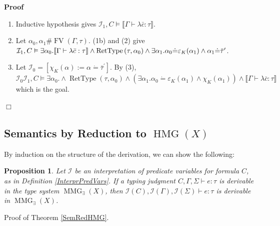 \documentclass{article}
\newcommand{\assign}{:=}
\newcommand{\tmop}[1]{\ensuremath{\operatorname{#1}}}
\newenvironment{proof}{\noindent\textbf{Proof\ }}{\hspace*{\fill}$\Box$\medskip}
\newtheorem{proposition}{Proposition}
\begin{document}
\begin{proof}
\begin{itemize}
\begin{enumerate}
      \item Inductive hypothesis gives $\mathcal{I}_1, C \vDash \llbracket
      \Gamma \vdash \lambda \bar{c} : \tau \rrbracket$.
      
      \item Let $\alpha_0, \alpha_1 \# \tmop{FV} (\Gamma, \tau)$. (1b) and (2)
      give $\mathcal{I}_1, C \vDash \exists \alpha_0 . \llbracket \Gamma
      \vdash \lambda \bar{c} : \tau \rrbracket \wedge \tmop{RetType} \left(
      \tau, {\nobreak} \alpha_0 \right) \wedge \exists \alpha_1 . \alpha_0
      \dot{=} \varepsilon_K (\alpha_1) \wedge \alpha_1 \dot{=}
      \bar{\tau}^{\prime}$.
      
      \item Let $\mathcal{I}_0 = [\chi_K (\alpha) \assign \alpha \dot{=}
      \bar{\tau}^{\prime}]$. By (3), $\mathcal{I}_0 \mathcal{I}_1, C \vDash
      \exists \alpha_0 . \wedge \tmop{RetType} (\tau, \alpha_0) \wedge
      (\exists \alpha_1 . \alpha_0 \dot{=} \varepsilon_K (\alpha_1) \wedge
      \chi_K (\alpha_1)) \wedge \llbracket \Gamma \vdash \lambda \bar{c} :
      \tau \rrbracket$ which is the goal.
    \end{enumerate}
  \end{itemize}
\end{proof}

\subsection{Semantics by Reduction to $\tmop{HMG} (X)$}\label{SemanticProofs}

By induction on the structure of the derivation, we can show the following:

\begin{proposition}
  \label{PredVarSubstDeriv}Let $\mathcal{I}$ be an interpretation of predicate
  variables for formula $C$, as in Definition \ref{InterprPredVars}. If a
  typing judgment $C, \Gamma, \Sigma \vdash e : \tau$ is derivable in the type
  system $\tmop{MMG}_{\exists} (X)$, then $\mathcal{I} (C), \mathcal{I}
  (\Gamma), \mathcal{I} (\Sigma) \vdash e : \tau$ is derivable in
  $\tmop{MMG}_{\exists} (X)$.
\end{proposition}

Proof of Theorem \ref{SemRedHMG}.
\end{document}

